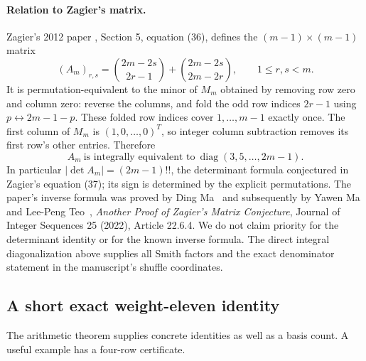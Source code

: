 \paragraph{Relation to Zagier's matrix.}
Zagier's 2012 paper \cite{Zagier}, Section 5, equation (36), defines the
$(m-1)\times(m-1)$ matrix
\[
 (A_m)_{r,s}=\binom{2m-2s}{2r-1}
             +\binom{2m-2s}{2m-2r},\qquad 1\leq r,s<m.
\]
It is permutation-equivalent to the minor of $M_m$ obtained by removing
row zero and column zero: reverse the columns, and fold the odd row
indices $2r-1$ using $p\leftrightarrow2m-1-p$.  These folded row
indices cover $1,\ldots,m-1$ exactly once.  The first column of $M_m$
is $(1,0,\ldots,0)^T$, so integer column subtraction removes its first
row's other entries.  Therefore
\[
 A_m\ \text{is integrally equivalent to}\
 \operatorname{diag}(3,5,\ldots,2m-1).
\]
In particular $|\det A_m|=(2m-1)!!$, the determinant formula conjectured
in Zagier's equation (37); its sign is determined by the explicit
permutations.  The paper's inverse formula was proved by Ding Ma~\cite{Ma} and subsequently by Yawen Ma and
Lee-Peng Teo~\cite{MaTeo},
\emph{Another Proof of Zagier's Matrix Conjecture}, Journal of Integer
Sequences 25 (2022), Article 22.6.4.  We do not claim priority for the
determinant identity or for the known inverse formula.  The direct
integral diagonalization above supplies all Smith factors and the exact
denominator statement in the manuscript's shuffle coordinates.

\subsection{A short exact weight-eleven identity}

The arithmetic theorem supplies concrete identities as well as a basis
count.  A useful example has a four-row certificate.

